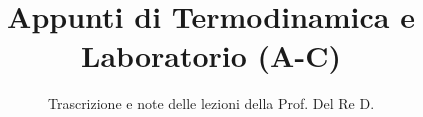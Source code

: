 \documentclass[a4paper,12pt]{article}
\title{Appunti di Termodinamica e Laboratorio (A-C)}
\author{Trascrizione e note delle lezioni della Prof. Del Re D.}
\date{}
\begin{document}
\maketitle
\projectintro
\tableofcontents
\newpage

\end{document}
